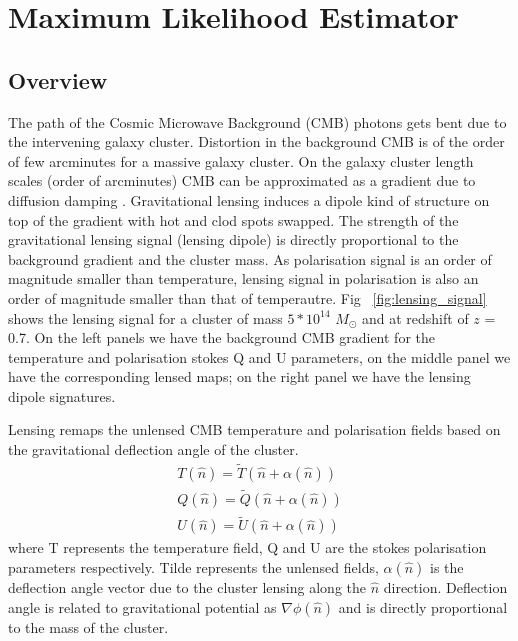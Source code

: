 \chapter{Maximum Likelihood Estimator}
\label{ch:MLE}
\section{Overview}
The path of the Cosmic Microwave Background (CMB) photons gets bent due to the intervening galaxy cluster. 
Distortion in the background CMB is of the order of few arcminutes for a massive galaxy cluster.
On the galaxy cluster length scales (order of arcminutes) CMB can be approximated as a gradient due to diffusion damping \citep{silk96}. 
Gravitational lensing induces a dipole kind of structure on top of the gradient with hot and clod spots swapped. 
The strength of the gravitational lensing signal (lensing dipole) is directly proportional to the background gradient and the cluster mass. 
As polarisation signal is an order of magnitude smaller than temperature, lensing signal in polarisation is also an order of magnitude smaller than that of temperautre. 
Fig ~\ref{fig:lensing_signal} shows the lensing signal for a cluster of mass $5*10^{14}$ $M_{\odot}$ and at redshift of $z$ = 0.7.
On the left panels we have the background CMB gradient for the temperature and polarisation stokes Q and U parameters, on the middle panel we have the corresponding lensed maps; on the right panel we have the lensing dipole signatures.

Lensing remaps the unlensed CMB temperature and polarisation fields based on the gravitational deflection angle of the cluster. 
\begin{eqnarray}
T(\hat{n}) = \tilde{T}(\hat{n} + \alpha(\hat{n}))\\
Q(\hat{n}) = \tilde{Q}(\hat{n} + \alpha(\hat{n}))\\
U(\hat{n}) =  \tilde{U}(\hat{n} + \alpha(\hat{n}))
\end{eqnarray}
where T represents the temperature field, Q and U are the stokes polarisation parameters respectively. 
Tilde represents the unlensed fields, $\alpha(\hat{n})$ is the deflection angle vector due to the cluster lensing along the $\hat{n}$ direction. 
Deflection angle is related to gravitational potential as $\nabla \phi (\hat{n})$ and is directly proportional to the mass of the cluster.

